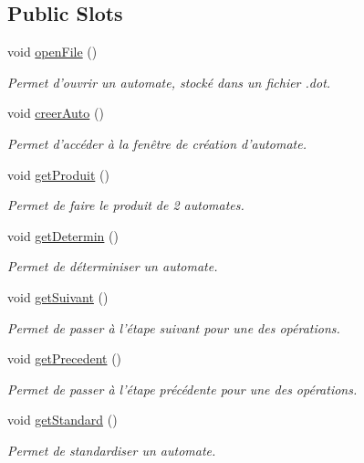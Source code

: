 \subsection*{Public Slots}
\begin{DoxyCompactItemize}
\item 
void \hyperlink{class_main_window_a288b768c3c21a9171bdc56fe845ece8b}{open\-File} ()
\begin{DoxyCompactList}\small\item\em Permet d'ouvrir un automate, stocké dans un fichier .dot. \end{DoxyCompactList}\item 
void \hyperlink{class_main_window_afc3b7768c20897733c1097fb5d956a6d}{creer\-Auto} ()
\begin{DoxyCompactList}\small\item\em Permet d'accéder à la fenêtre de création d'automate. \end{DoxyCompactList}\item 
void \hyperlink{class_main_window_a2b49ea4a32d41b1a5a60c8d3b844a122}{get\-Produit} ()
\begin{DoxyCompactList}\small\item\em Permet de faire le produit de 2 automates. \end{DoxyCompactList}\item 
void \hyperlink{class_main_window_ada476693941f6f33c5ec3c6089ec4058}{get\-Determin} ()
\begin{DoxyCompactList}\small\item\em Permet de déterminiser un automate. \end{DoxyCompactList}\item 
void \hyperlink{class_main_window_a5163f212156eecd4624ced33f1574361}{get\-Suivant} ()
\begin{DoxyCompactList}\small\item\em Permet de passer à l'étape suivant pour une des opérations. \end{DoxyCompactList}\item 
void \hyperlink{class_main_window_ad3f7fb432b87dd1c613d678cbc2b36fe}{get\-Precedent} ()
\begin{DoxyCompactList}\small\item\em Permet de passer à l'étape précédente pour une des opérations. \end{DoxyCompactList}\item 
void \hyperlink{class_main_window_a8743d62b3db7581d930b2b8faa852ca7}{get\-Standard} ()
\begin{DoxyCompactList}\small\item\em Permet de standardiser un automate. \end{DoxyCompactList}\item 

\end{DoxyCompactItemize}
